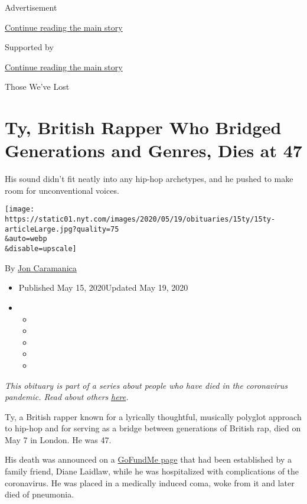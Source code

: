 Advertisement

\protect\hyperlink{after-top}{Continue reading the main story}

Supported by

\protect\hyperlink{after-sponsor}{Continue reading the main story}

Those We've Lost

\hypertarget{ty-british-rapper-who-bridged-generations-and-genres-dies-at-47}{%
\section{Ty, British Rapper Who Bridged Generations and Genres, Dies at
47}\label{ty-british-rapper-who-bridged-generations-and-genres-dies-at-47}}

His sound didn't fit neatly into any hip-hop archetypes, and he pushed
to make room for unconventional voices.

\texttt{[image: https://static01.nyt.com/images/2020/05/19/obituaries/15ty/15ty-articleLarge.jpg?quality=75\\\&auto=webp\\\&disable=upscale]}

By \href{https://www.nytimes.com/by/jon-caramanica}{Jon Caramanica}

\begin{itemize}
\item
  Published May 15, 2020Updated May 19, 2020
\item
  \begin{itemize}
  \item
  \item
  \item
  \item
  \item
  \end{itemize}
\end{itemize}

\emph{This obituary is part of a series about people who have died in
the coronavirus pandemic. Read about others}
\href{https://www.nytimes.com/series/people-who-have-died-of-the-coronavirus}{\emph{here}}\emph{.}

Ty, a British rapper known for a lyrically thoughtful, musically
polyglot approach to hip-hop and for serving as a bridge between
generations of British rap, died on May 7 in London. He was 47.

His death was announced on a
\href{https://www.gofundme.com/f/community-support-for-ty}{GoFundMe
page} that had been established by a family friend, Diane Laidlaw, while
he was hospitalized with complications of the coronavirus. He was placed
in a medically induced coma, woke from it and later died of pneumonia.

